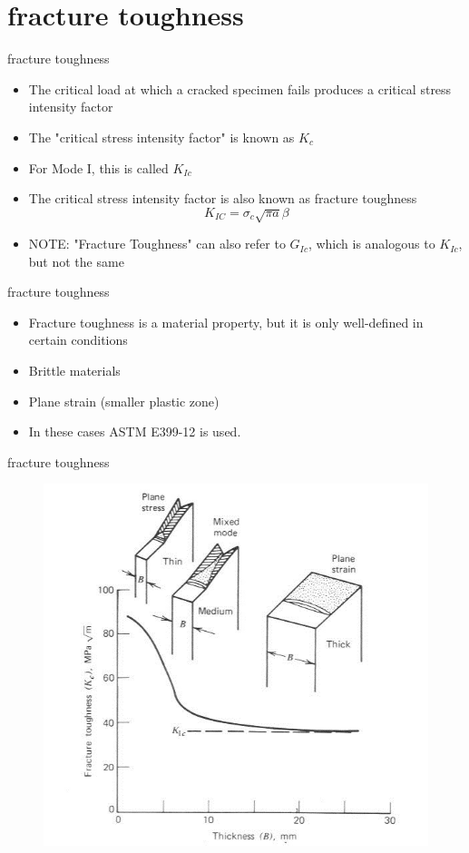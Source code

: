 \documentclass[10pt]{beamer}
\begin{document}
\section{fracture toughness}

\begin{frame}{fracture toughness}
	\begin{itemize}
		\item The critical load at which a cracked specimen fails produces a critical stress intensity factor
		\item The "critical stress intensity factor" is known as $K_c$
		\item For Mode I, this is called $K_{Ic}$
		\item The critical stress intensity factor is also known as fracture toughness
		\begin{equation}
		K_{IC} = \sigma_c \sqrt{\pi a}\beta
		\end{equation}
		\pause
		\item NOTE: "Fracture Toughness" can also refer to $G_{Ic}$, which is analogous to $K_{Ic}$, but not the same
	\end{itemize}
\end{frame}

\begin{frame}{fracture toughness}
	\begin{itemize}
		\item Fracture toughness is a material property, but it is only well-defined in certain conditions
		\item Brittle materials
		\item Plane strain (smaller plastic zone)
		\item In these cases ASTM E399-12 is used.
	\end{itemize}
\end{frame}

\begin{frame}{fracture toughness}
	\begin{figure}
		\centering
		\includegraphics[width=0.7\linewidth]{KIC_thickness}
		\label{fig:KIC_thickness}
	\end{figure}
\end{frame}
\end{document}
